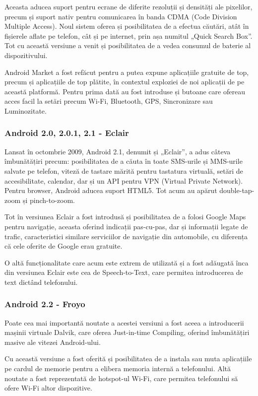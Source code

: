 \documentclass[12pt,a4paper]{article}
\begin{document}
	Aceasta aducea suport pentru ecrane de diferite rezoluții și densități ale pixelilor, precum și suport nativ pentru comunicarea în banda CDMA (Code Division Multiple Access). Noul sistem oferea și posibilitatea de a efectua căutări, atât în fișierele aflate pe telefon, cât și pe internet, prin așa numitul „Quick Search Box”. Tot cu această versiune a venit și posibilitatea de a vedea consumul de baterie al dispozitivului.
	
	Android Market a fost refăcut pentru a putea expune aplicațiile gratuite de top, precum și aplicațiile de top plătite, în contextul exploziei de noi aplicații de pe această platformă. Pentru prima dată au fost introduse și butoane care ofereau acces facil la setări precum Wi-Fi, Bluetooth, GPS, Sincronizare sau Luminozitate.


\subsubsection{Android 2.0, 2.0.1, 2.1 - Eclair}
Lansat în octombrie 2009, Android 2.1, denumit și „Eclair”, a adus câteva îmbunătățiri precum: posibilitatea de a căuta în toate SMS-urile și MMS-urile salvate pe telefon, viteză de tastare mărită pentru tastatura virtuală, setări de accesibilitate, calendar, dar și un API pentru VPN (Virtual Private Network). Pentru browser, Android aducea suport HTML5. Tot acum au apărut double-tap-zoom și pinch-to-zoom.
	
	Tot în versiunea Eclair a fost introdusă și posibilitatea de a folosi Google Maps pentru navigație, aceasta oferind indicații pas-cu-pas, dar și informații legate de trafic, caracteristici similare serviciilor de navigație din automobile, cu diferența că cele oferite de Google erau gratuite.

	O altă funcționalitate care acum este extrem de utilizată și a fost adăugată înca din versiunea Eclair este cea de Speech-to-Text, care permitea introducerea de text dictând telefonului.
	

\subsubsection{Android 2.2 - Froyo}
Poate cea mai importantă noutate a acestei versiuni a fost aceea a introducerii mașinii virtuale Dalvik, care oferea Just-in-time Compiling, oferind îmbunătățiri masive ale vitezei Android-ului.

	Cu această versiune a fost oferită și posibilitatea de a instala sau muta aplicațiile pe cardul de memorie pentru a elibera memoria internă a telefonului. Altă noutate a fost reprezentată de hotspot-ul Wi-Fi, care permitea telefonului să ofere Wi-Fi altor dispozitive.
\end{document}
